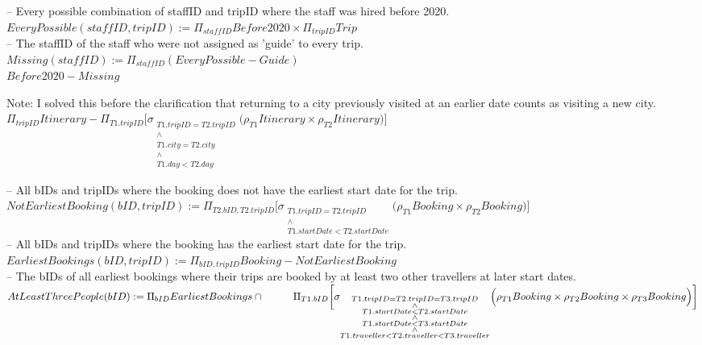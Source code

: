 \documentclass{article}
\newcommand{\var}[1]{\mathit{#1}}
\begin{document}
\begin{enumerate}
{    -- Every possible combination of staffID and tripID where the staff was hired before 2020. \\[5pt]
    $EveryPossible(\var{staffID}, tripID) := \Pi_{\var{staffID}} \var{Before2020} \times \Pi_{tripID} Trip$ \\[10pt]
    -- The staffID of the staff who were not assigned as 'guide' to every trip. \\[5pt]
    $Missing(\var{staffID}) := \Pi_{\var{staffID}} (EveryPossible - Guide)$ \\[10pt]
    $Before2020 - Missing$
    \item Note: I solved this before the clarification that returning to a city previously visited at an earlier date counts as visiting a new city. \\[5pt]
    $\Pi_{tripID} Itinerary - \Pi_{T1.tripID} \bigg[ \sigma_{\substack{T1.tripID = T2.tripID \\ \wedge \\ T1.city = T2.city \\ \wedge \\ T1.day < T2.day}} \Bigg( \rho_{T1} Itinerary \times \rho_{T2} Itinerary \Bigg) \bigg]$
    \item -- All bIDs and tripIDs where the booking does not have the earliest start date for the trip. \\[5pt]
    $NotEarliestBooking(bID, tripID) := \Pi_{T2.bID, T2.tripID} \bigg[ \sigma_{\substack{T1.tripID = T2.tripID \\ \wedge \\ T1.startDate < T2.startDate}} \Big( \rho_{T1} Booking \times \rho_{T2} Booking \Big) \bigg]$ \\[10pt]
    -- All bIDs and tripIDs where the booking has the earliest start date for the trip. \\[5pt]
    $EarliestBookings(bID, tripID) := \Pi_{bID, tripID} Booking - NotEarliestBooking$ \\[10pt]
    -- The bIDs of all earliest bookings where their trips are booked by at least two other travellers at later start dates. \\[5pt]
    $AtLeastThreePeople(bID) := \Pi_{bID} EarliestBookings \cap \\[5pt]
    \hspace*{1cm} \Pi_{T1.bID} \bigg[ \sigma_{\substack{T1.tripID = T2.tripID = T3.tripID \\ \wedge \\ T1.startDate < T2.startDate \\ \wedge \\ T1.startDate < T3.startDate \\ \wedge \\ T1.traveller < T2.traveller < T3.traveller}} \Big( \rho_{T1} Booking \times \rho_{T2} Booking \times \rho_{T3} Booking \Big) \bigg]$ \\[10pt]
}
\end{enumerate}
\end{document}
